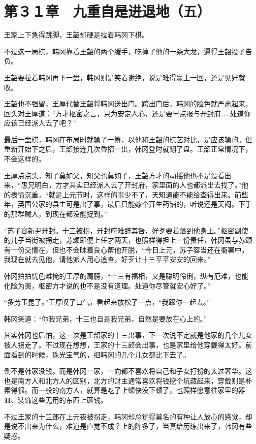 \section{第３１章　九重自是进退地（五）}

王家上下急得跳脚，王韶却硬是拉着韩冈下棋。

不过这一局棋，韩冈靠着王韶的两个缓手，吃掉了他的一条大龙，逼得王韶投子告负。

王韶要拉着韩冈再下一盘，韩冈则是笑着谢绝，说是难得赢上一回，还是见好就收。

王韶也不强留，王厚代替王韶将韩冈送出门。跨出门后，韩冈的脸色就严肃起来，回头对王厚道：“方才枢密之言，只为安定人心，还是要早点报与开封府……处道你应该已经派人去了吧？”

最后一盘棋，韩冈在布局时就输了一筹，以他和王韶的棋艺对比，是应该输的。但重新开始下之后，王韶接连几次昏招一出，韩冈登时就翻了盘。王韶正常情况下，不会这样的。

王厚点点头，知子莫如父，知父也莫如子，王韶方才的动摇他也不是没看出来，“愚兄明白，方才其实已经派人去了开封府，家里面的人也都派出去找了。”他的表情沉重，“就是上元节时，这样的事少不了，天知道能不能给查得出来。前些年，英国公家的县主可是出了事，最后只能嫁个开生药铺的，听说还是天阉。下手的那群贼人，到现在都没能捉到。”

“苏子容新尹开封。十三被拐，开封府难辞其咎，好歹要着落到他身上。”枢密副使的儿子当街被拐走，苏颂即便上任才两天，也照样得担上一份责任，韩冈虽与苏颂有一份交情在，但也不会昧着良心帮他开脱，“今日上元，苏子容当还在衙署中，我现在就去见他，请他派人用心追查，好歹让十三平平安安的回来。”

韩冈拍拍忧色难掩的王厚的肩膀，“十三有福相，又是聪明伶俐，纵有厄难，也能化险为夷，枢密方才说的也不是没有道理。处道你尽管就安心好了。”

“多劳玉昆了。”王厚叹了口气，看起来放松了一点，“我跟你一起去。”

韩冈笑道：“你我兄弟，十三也自是我兄弟，自然是要放在心上的。”

其实韩冈也后怕，这一次是王韶家的十三出事，下一次说不定就是他家的几个儿女被人拐走了。不过现在想想，王家的十三郎会出事，也是家里给他穿戴得太好。前面看到的时候，珠光宝气的，把韩冈的几个儿女都比下去了。

倒不是韩家没钱。而是韩冈一家，一向都不喜欢将自己和子女打扮的太过奢华。这也是南方人和北方人的区别，北方的财主通常喜欢将钱挖个坑藏起来，穿戴则是朴素得很。而一般的南方人，就算是吃了上顿快没下顿了，也照样愿意往家里的器皿、装饰这些无用的东西上砸钱。

不过王家的十三郎在上元夜被拐走，韩冈却总觉得莫名的有种让人放心的感觉，却是说不出来为什么，难道是直觉不成？上的阵多了，当真给历练出来了，韩冈有些疑惑。

